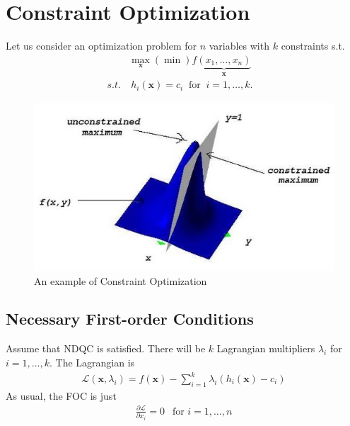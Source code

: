 \documentclass[11pt,a4paper]{book}
\theoremstyle{definition}\newtheorem{definition}{Definition}
\theoremstyle{definition}\newtheorem{fact}{Fact}
\theoremstyle{definition}\newtheorem{remark}{Remark}
\theoremstyle{definition}\newtheorem{ex}{Ex.}
\theoremstyle{definition}\newtheorem{project}{Project}
\theoremstyle{definition}\newtheorem{problem}{Problem}
\theoremstyle{definition}\newtheorem{example}{Example}
\numberwithin{theorem}{section}
\numberwithin{corollary}{chapter}
\numberwithin{assumption}{chapter}
\numberwithin{definition}{chapter}
\numberwithin{prop}{chapter}
\numberwithin{notation}{chapter}
\numberwithin{problem}{chapter}
\numberwithin{example}{chapter}
\numberwithin{fact}{chapter}
\numberwithin{ex}{chapter}
\def\x{\mathbf x}
\begin{document}
	\newpage	
	\section{Constraint Optimization}
		Let us consider an optimization problem for $n$ variables with $k$ constraints s.t.
	\begin{align*}
		& \max_{\x} (\min) f \underbrace{(x_1, \dots, x_n)}_{\x} \\
		s.t. &\ h_i (\x) = c_i \ \text{ for } \ i = 1, \dots, k. &                                                        
	\end{align*}
	
	\begin{figure}[ht]
		\centering
		\includegraphics[scale=0.7]{figs/cons_vs_uncons.jpg}
		\caption{An example of Constraint Optimization}
	\end{figure}
		
	\subsection{Necessary First-order Conditions}
	Assume that NDQC is satisfied. There will be $k$ Lagrangian multipliers $\lambda_i$ for  $i = 1, \dots, k$. The Lagrangian is
	\begin{align*}
		\mathcal{L} (\x, \lambda_i) = f(\x) - \sum^k_{i=1} \lambda_i (h_i(\x) - c_i) 
	\end{align*}
	As usual, the FOC is just
	\begin{align*}
		\frac{\partial \mathcal{L}}{\partial x_i} = 0  \ \ \text{ for $i=1,\dots,n$}
	\end{align*}
	
\end{document}
